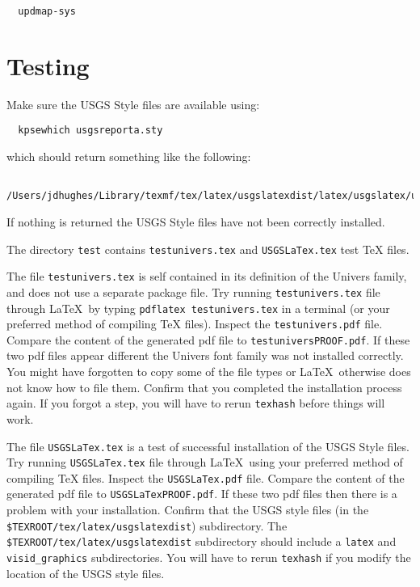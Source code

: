 \documentclass[11pt]{article}
\begin{document}
\begin{verbatim}
  updmap-sys
\end{verbatim}


\section*{\textsf{Testing}}

Make sure the USGS Style files are available using:

\begin{verbatim}
  kpsewhich usgsreporta.sty
\end{verbatim}

\noindent which should return something like the following:

\begin{verbatim}
  /Users/jdhughes/Library/texmf/tex/latex/usgslatexdist/latex/usgslatex/usgsreporta.sty
\end{verbatim}

\noindent If nothing is returned the USGS Style files have not been correctly installed.

The directory \texttt{test} contains \texttt{testunivers.tex} and \texttt{USGSLaTex.tex} test \TeX \hspace{1pt} files. 

The file \texttt{testunivers.tex} is self contained in its definition of the Univers family, and does not use a separate package file. Try running \texttt{testunivers.tex} file through \LaTeX\ by typing \texttt{pdflatex testunivers.tex} in a terminal (or your preferred method of compiling  \TeX \hspace{1pt} files). Inspect the \texttt{testunivers.pdf} file. Compare the content of the generated \textsf{pdf} file to \texttt{testuniversPROOF.pdf}. If these two \textsf{pdf} files appear different the Univers font family was not installed correctly. You might have forgotten to copy some of the file types or \LaTeX\ otherwise does not know how to file them. Confirm that you completed the installation process again. If you forgot a step, you will have to rerun \texttt{texhash} before things will work.

The file \texttt{USGSLaTex.tex} is a test of successful installation of the USGS Style files. Try running \texttt{USGSLaTex.tex} file through \LaTeX\ using your preferred method of compiling  \TeX \hspace{1pt} files. Inspect the \texttt{USGSLaTex.pdf} file. Compare the content of the generated \textsf{pdf} file to \texttt{USGSLaTexPROOF.pdf}. If these two \textsf{pdf} files then there is a problem with your installation. Confirm that the USGS style files (in the \texttt{\$TEXROOT/tex/latex/usgslatexdist}) subdirectory. The \texttt{\$TEXROOT/tex/latex/usgslatexdist} subdirectory should include a \texttt{latex} and \texttt{visid\_graphics} subdirectories. You will have to rerun \texttt{texhash} if you modify the location of the USGS style files.
\end{document}
